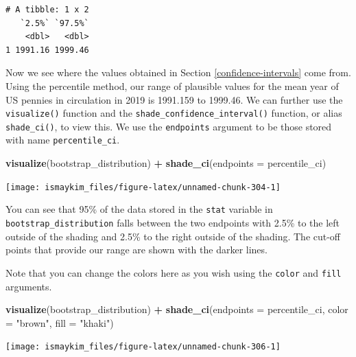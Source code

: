 \documentclass[12pt, krantz2,]{krantz}
\makeatletter
\newenvironment{Shaded}{\begin{snugshade}}{\end{snugshade}}
\newcommand{\DataTypeTok}[1]{\textcolor[rgb]{0.27,0.27,0.27}{#1}}
\newcommand{\KeywordTok}[1]{\textcolor[rgb]{0.27,0.27,0.27}{\textbf{#1}}}
\newcommand{\NormalTok}[1]{#1}
\newcommand{\OperatorTok}[1]{\textcolor[rgb]{0.43,0.43,0.43}{\textbf{#1}}}
\newcommand{\StringTok}[1]{\textcolor[rgb]{0.5,0.5,0.5}{#1}}
\newenvironment{kframe}{%
\medskip{}
\setlength{\fboxsep}{.8em}
 \def\at@end@of@kframe{}%
 \ifinner\ifhmode%
  \def\at@end@of@kframe{\end{minipage}}%
  \begin{minipage}{\columnwidth}%
 \fi\fi%
 \def\FrameCommand##1{\hskip\@totalleftmargin \hskip-\fboxsep
 \colorbox{shadecolor}{##1}\hskip-\fboxsep
     \hskip-\linewidth \hskip-\@totalleftmargin \hskip\columnwidth}%
 \MakeFramed {\advance\hsize-\width
   \@totalleftmargin\z@ \linewidth\hsize
   \@setminipage}}%
 {\par\unskip\endMakeFramed%
 \at@end@of@kframe}
\renewenvironment{Shaded}{\begin{kframe}}{\end{kframe}}
\makeatother
\begin{document}
\begin{verbatim}
# A tibble: 1 x 2
   `2.5%` `97.5%`
    <dbl>   <dbl>
1 1991.16 1999.46
\end{verbatim}

Now we see where the values obtained in Section \ref{confidence-intervals} come from. Using the percentile method, our range of plausible values for the mean year of US pennies in circulation in 2019 is 1991.159 to 1999.46. We can further use the \texttt{visualize()} function and the \texttt{shade\_confidence\_interval()} function, or alias \texttt{shade\_ci()}, to view this. We use the \texttt{endpoints} argument to be those stored with name \texttt{percentile\_ci}.

\begin{Shaded}
\begin{Highlighting}[]
\KeywordTok{visualize}\NormalTok{(bootstrap_distribution) }\OperatorTok{+}\StringTok{ }
\StringTok{  }\KeywordTok{shade_ci}\NormalTok{(}\DataTypeTok{endpoints =}\NormalTok{ percentile_ci)}
\end{Highlighting}
\end{Shaded}

\begin{center}\texttt{[image: ismaykim\_files/figure-latex/unnamed-chunk-304-1]} \end{center}

You can see that 95\% of the data stored in the \texttt{stat} variable in \texttt{bootstrap\_distribution} falls between the two endpoints with 2.5\% to the left outside of the shading and 2.5\% to the right outside of the shading. The cut-off points that provide our range are shown with the darker lines.

Note that you can change the colors here as you wish using the \texttt{color} and \texttt{fill} arguments.

\begin{Shaded}
\begin{Highlighting}[]
\KeywordTok{visualize}\NormalTok{(bootstrap_distribution) }\OperatorTok{+}\StringTok{ }
\StringTok{  }\KeywordTok{shade_ci}\NormalTok{(}\DataTypeTok{endpoints =}\NormalTok{ percentile_ci,}
           \DataTypeTok{color =} \StringTok{"brown"}\NormalTok{,}
           \DataTypeTok{fill =} \StringTok{"khaki"}\NormalTok{)}
\end{Highlighting}
\end{Shaded}

\begin{center}\texttt{[image: ismaykim\_files/figure-latex/unnamed-chunk-306-1]} \end{center}
\end{document}
